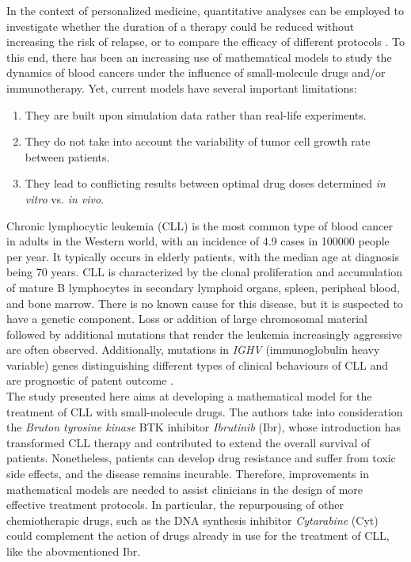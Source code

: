 In the context of personalized medicine, quantitative analyses can be employed to investigate whether the duration of a therapy could be reduced without increasing the risk of relapse, or to compare the efficacy of different protocols \cite{pers-med}.
To this end, there has been an increasing use of mathematical models to study the dynamics of blood cancers under the influence of small-molecule drugs and/or immunotherapy.
Yet, current models have several important limitations: 
\begin{enumerate}
	\item They are built upon simulation data rather than real-life experiments.
	\item They do not take into account the variability of tumor cell growth rate between patients.
	\item They lead to conflicting results between optimal drug doses determined \textit{in vitro} vs. \textit{in vivo}.
\end{enumerate}
Chronic lymphocytic leukemia (CLL) is the most common type of blood cancer in adults in the Western world, with an incidence of 4.9 cases in 100000 people per year. It typically occurs in elderly patients, with the median age at diagnosis being 70 years. CLL is characterized by the clonal proliferation and accumulation of mature B lymphocytes in secondary lymphoid organs, spleen, peripheal blood, and bone marrow. \cite{cll-burger-med, cll-rozman-med}  There is no known cause for this disease, but it is suspected to have a genetic component. Loss or addition of large chromosomal material followed by additional mutations that render the leukemia increasingly aggressive are often observed. Additionally, mutations in \textit{IGHV} (immunoglobulin heavy variable) genes distinguishing different types of clinical behaviours of CLL and are prognostic of patent outcome \cite{immunogl-med}.\\
The study presented here \cite{main-paper} aims at developing a mathematical model for the treatment of CLL with small-molecule drugs. The authors take into consideration the \textit{Bruton tyrosine kinase} BTK inhibitor \textit{Ibrutinib} (Ibr), whose introduction has transformed CLL therapy and contributed to extend the overall survival of patients.
Nonetheless, patients can develop drug resistance and suffer from toxic side effects, and the disease remains incurable. Therefore, improvements in mathematical models are needed to assist clinicians in the design of more effective treatment protocols. In particular, the repurpousing of other chemiotherapic drugs, such as the DNA synthesis inhibitor \textit{Cytarabine} (Cyt) could complement the action of drugs already in use for the treatment of CLL, like the abovmentioned Ibr.\\
